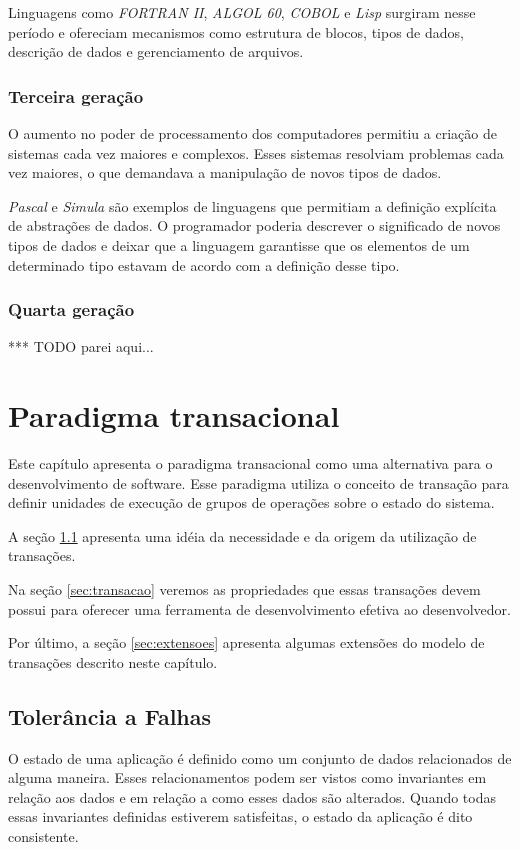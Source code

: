 \documentclass[11pt,twoside,a4paper]{book}
\begin{document}
Linguagens como \emph{FORTRAN II}, \emph{ALGOL 60}, \emph{COBOL} e \emph{Lisp} surgiram nesse período e ofereciam mecanismos como estrutura de blocos, tipos de dados, descrição de dados e gerenciamento de arquivos.

\subsection*{Terceira geração}
O aumento no poder de processamento dos computadores permitiu a criação de sistemas cada vez maiores e complexos. Esses sistemas resolviam problemas cada vez maiores, o que demandava a manipulação de novos tipos de dados.

\emph{Pascal} e \emph{Simula} são exemplos de linguagens que permitiam a definição explícita de abstrações de dados. O programador poderia descrever o significado de novos tipos de dados e deixar que a linguagem garantisse que os elementos de um determinado tipo estavam de acordo com a definição desse tipo.

\subsection*{Quarta geração}
*** TODO parei aqui...

\chapter{Paradigma transacional}
\label{chap:transacao}
Este capítulo apresenta o paradigma transacional como uma alternativa para o desenvolvimento de software. Esse paradigma utiliza o conceito de transação para definir unidades de execução de grupos de operações sobre o estado do sistema.

A seção \ref{sec:tolerancia_a_falhas} apresenta uma idéia da necessidade e da origem da utilização de transações.

Na seção \ref{sec:transacao} veremos as propriedades que essas transações devem possui para oferecer uma ferramenta de desenvolvimento efetiva ao desenvolvedor.

Por último, a seção \ref{sec:extensoes} apresenta algumas extensões do modelo de transações descrito neste capítulo.

\section{Tolerância a Falhas}
\label{sec:tolerancia_a_falhas}
O estado de uma aplicação é definido como um conjunto de dados relacionados de alguma maneira. Esses relacionamentos podem ser vistos como invariantes em relação aos dados e em relação a como esses dados são alterados. Quando todas essas invariantes definidas estiverem satisfeitas, o estado da aplicação é dito consistente.
\end{document}
